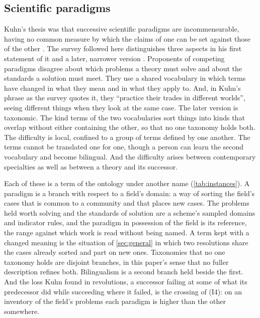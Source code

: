 \subsection{Scientific paradigms}
\label{sec:paradigms}

Kuhn's thesis was that successive scientific paradigms are incommensurable, having no common measure by which the claims of one can be set against those of the other \cite{Kuhn1962}. The survey followed here distinguishes three aspects in his first statement of it and a later, narrower version \cite{OberheimHoyningenHuene2024}. Proponents of competing paradigms disagree about which problems a theory must solve and about the standards a solution must meet. They use a shared vocabulary in which terms have changed in what they mean and in what they apply to. And, in Kuhn's phrase as the survey quotes it, they ``practice their trades in different worlds'', seeing different things when they look at the same case. The later version is taxonomic. The kind terms of the two vocabularies sort things into kinds that overlap without either containing the other, so that no one taxonomy holds both. The difficulty is local, confined to a group of terms defined by one another. The terms cannot be translated one for one, though a person can learn the second vocabulary and become bilingual. And the difficulty arises between contemporary specialties as well as between a theory and its successor.

Each of these is a term of the ontology under another name (\autoref{tab:instances}). A paradigm is a branch with respect to a field's domain: a way of sorting the field's cases that is common to a community and that places new cases. The problems held worth solving and the standards of solution are a scheme's sampled domains and indicator rules, and the paradigm in possession of the field is its reference, the range against which work is read without being named. A term kept with a changed meaning is the situation of \autoref{sec:general} in which two resolutions share the cases already sorted and part on new ones. Taxonomies that no one taxonomy holds are disjoint branches, in this paper's sense that no fuller description refines both. Bilingualism is a second branch held beside the first. And the loss Kuhn found in revolutions, a successor failing at some of what its predecessor did while succeeding where it failed, is the crossing of (I4): on an inventory of the field's problems each paradigm is higher than the other somewhere.

